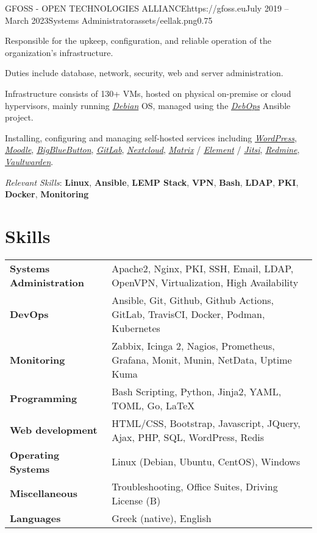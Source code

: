 \documentclass{mycv}
\begin{document}
	\begin{EntryDatedLogo}{GFOSS - OPEN TECHNOLOGIES ALLIANCE}{https://gfoss.eu}{July 2019 -- March 2023}{Systems Administrator}{assets/eellak.png}{0.75}
		\begin{Itemize}
			\item Responsible for the upkeep, configuration, and reliable operation of the organization's infrastructure.
			\item Duties include database, network, security, web and server administration.
			\item Infrastructure consists of 130+ VMs, hosted on physical on-premise or cloud hypervisors, mainly running \href{https://www.debian.org}{\textit{Debian}} OS, managed using the \href{https://debops.org}{\textit{DebOps}} Ansible project.
			\item Installing, configuring and managing self-hosted services including \href{https://wordpress.com}{\textit{WordPress}}, \href{https://moodle.org}{\textit{Moodle}}, \href{https://bigbluebutton.org}{\textit{BigBlueButton}}, \href{https://about.gitlab.com/install/}{\textit{GitLab}}, \href{https://nextcloud.com}{\textit{Nextcloud}}, \href{https://matrix.org}{\textit{Matrix}} / \href{https://element.io}{\textit{Element}} / \href{https://jitsi.org}{\textit{Jitsi}}, \href{https://www.redmine.org/}{\textit{Redmine}}, \href{https://vaultwarden.discourse.group/}{\textit{Vaultwarden}}.
			\item \textit{Relevant Skills}: \textbf{Linux}, \textbf{Ansible}, \textbf{LEMP Stack}, \textbf{VPN}, \textbf{Bash}, \textbf{LDAP}, \textbf{PKI}, \textbf{Docker}, \textbf{Monitoring}
  \end{Itemize}
	\end{EntryDatedLogo}

	\section{Skills}
	\begin{tabular}{m{4.5cm} m{12.5cm}}
		\textbf{Systems Administration}	& Apache2, Nginx, PKI, SSH, Email, LDAP, OpenVPN, Virtualization, High Availability \\
		\textbf{DevOps}	                & Ansible, Git, Github, Github Actions, GitLab, TravisCI, Docker, Podman, Kubernetes \\
		\textbf{Monitoring}             & Zabbix, Icinga 2, Nagios, Prometheus, Grafana, Monit, Munin, NetData, Uptime Kuma \\
		\textbf{Programming} 	 	   	& Bash Scripting, Python, Jinja2, YAML, TOML, Go, \LaTeX \\
		\textbf{Web development}	   	& HTML/CSS, Bootstrap, Javascript, JQuery, Ajax, PHP, SQL, WordPress, Redis \\
		\textbf{Operating Systems}   	& Linux (Debian, Ubuntu, CentOS), Windows \\
		\textbf{Miscellaneous}         	& Troubleshooting, Office Suites, Driving License (B) \\
		\textbf{Languages} 			   	& Greek (native), English 
	\end{tabular}
\end{document}
